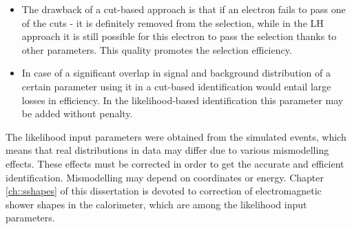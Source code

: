     \begin{itemize}
    	\item The drawback of a cut-based approach is that if an electron fails to pass one of the cuts - it is definitely removed from the selection, while in the LH approach it is still possible for this electron to pass the selection thanks to other parameters. This quality promotes the selection efficiency. 
    	\item In case of a significant overlap in signal and background distribution of a certain parameter using it in a cut-based identification would entail large losses in efficiency. In the likelihood-based identification this parameter may be added without penalty. 
	\end{itemize}
	The likelihood input parameters were obtained from the simulated events, which means that real distributions in data may differ due to various mismodelling effects. These effects must be corrected in order to get the accurate and efficient identification. Mismodelling may depend on coordinates or energy. Chapter \ref{ch::sshapes} of this dissertation is devoted to correction of electromagnetic shower shapes in the calorimeter, which are among the likelihood input parameters.
